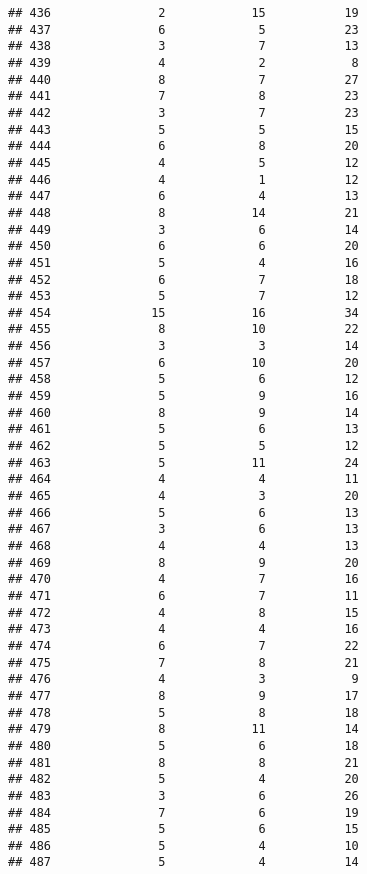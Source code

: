 \documentclass[
]{article}
\begin{document}
\begin{verbatim}
## 436               2            15           19
## 437               6             5           23
## 438               3             7           13
## 439               4             2            8
## 440               8             7           27
## 441               7             8           23
## 442               3             7           23
## 443               5             5           15
## 444               6             8           20
## 445               4             5           12
## 446               4             1           12
## 447               6             4           13
## 448               8            14           21
## 449               3             6           14
## 450               6             6           20
## 451               5             4           16
## 452               6             7           18
## 453               5             7           12
## 454              15            16           34
## 455               8            10           22
## 456               3             3           14
## 457               6            10           20
## 458               5             6           12
## 459               5             9           16
## 460               8             9           14
## 461               5             6           13
## 462               5             5           12
## 463               5            11           24
## 464               4             4           11
## 465               4             3           20
## 466               5             6           13
## 467               3             6           13
## 468               4             4           13
## 469               8             9           20
## 470               4             7           16
## 471               6             7           11
## 472               4             8           15
## 473               4             4           16
## 474               6             7           22
## 475               7             8           21
## 476               4             3            9
## 477               8             9           17
## 478               5             8           18
## 479               8            11           14
## 480               5             6           18
## 481               8             8           21
## 482               5             4           20
## 483               3             6           26
## 484               7             6           19
## 485               5             6           15
## 486               5             4           10
## 487               5             4           14

\end{verbatim}
\end{document}
